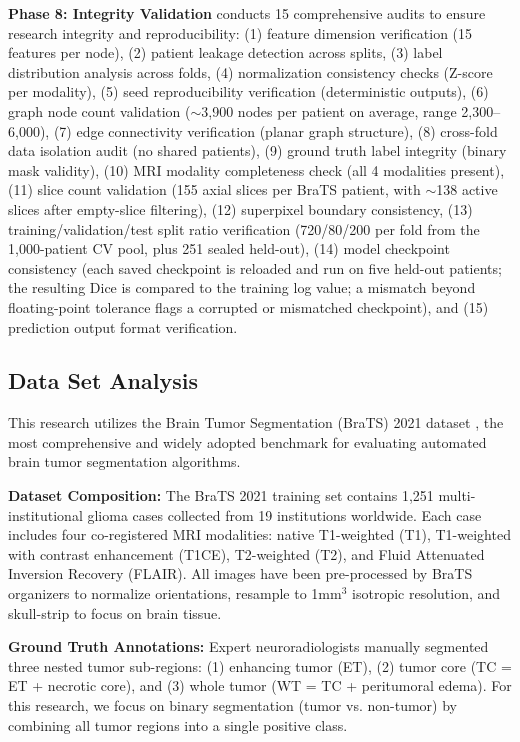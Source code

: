 \documentclass{article}
\begin{document}
\textbf{Phase 8: Integrity Validation} conducts 15 comprehensive audits to ensure research integrity and reproducibility: (1) feature dimension verification (15 features per node), (2) patient leakage detection across splits, (3) label distribution analysis across folds, (4) normalization consistency checks (Z-score per modality), (5) seed reproducibility verification (deterministic outputs), (6) graph node count validation ($\sim$3,900 nodes per patient on average, range 2,300--6,000), (7) edge connectivity verification (planar graph structure), (8) cross-fold data isolation audit (no shared patients), (9) ground truth label integrity (binary mask validity), (10) MRI modality completeness check (all 4 modalities present), (11) slice count validation (155 axial slices per BraTS patient, with $\sim$138 active slices after empty-slice filtering), (12) superpixel boundary consistency, (13) training/validation/test split ratio verification (720/80/200 per fold from the 1,000-patient CV pool, plus 251 sealed held-out), (14) model checkpoint consistency (each saved checkpoint is reloaded and run on five held-out patients; the resulting Dice is compared to the training log value; a mismatch beyond floating-point tolerance flags a corrupted or mismatched checkpoint), and (15) prediction output format verification.


\subsection{Data Set Analysis}

This research utilizes the Brain Tumor Segmentation (BraTS) 2021 dataset \cite{menze2015multimodal, bakas2017advancing}, the most comprehensive and widely adopted benchmark for evaluating automated brain tumor segmentation algorithms.

\textbf{Dataset Composition:} The BraTS 2021 training set \cite{menze2015multimodal} contains 1,251 multi-institutional glioma cases collected from 19 institutions worldwide. Each case includes four co-registered MRI modalities: native T1-weighted (T1), T1-weighted with contrast enhancement (T1CE), T2-weighted (T2), and Fluid Attenuated Inversion Recovery (FLAIR). All images have been pre-processed by BraTS organizers to normalize orientations, resample to 1mm$^3$ isotropic resolution, and skull-strip to focus on brain tissue.

\textbf{Ground Truth Annotations:} Expert neuroradiologists manually segmented three nested tumor sub-regions: (1) enhancing tumor (ET), (2) tumor core (TC = ET + necrotic core), and (3) whole tumor (WT = TC + peritumoral edema). For this research, we focus on binary segmentation (tumor vs. non-tumor) by combining all tumor regions into a single positive class.
\end{document}

